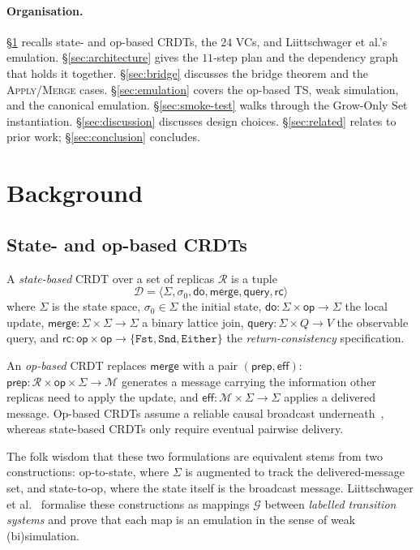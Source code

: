 \documentclass[11pt,a4paper]{article}
\theoremstyle{definition}
\theoremstyle{remark}
\newcommand{\RDT}{\ensuremath{\mathcal{D}}}
\newcommand{\Op}{\mathsf{op}}
\newcommand{\mdo}{\mathsf{do}}
\newcommand{\mmerge}{\mathsf{merge}}
\newcommand{\meff}{\mathsf{eff}}
\newcommand{\mquery}{\mathsf{query}}
\newcommand{\mrc}{\mathsf{rc}}
\newcommand{\mprep}{\mathsf{prep}}
\newcommand{\Either}{\mathtt{Either}}
\newcommand{\Fst}{\mathtt{Fst}}
\newcommand{\Snd}{\mathtt{Snd}}
\newcommand{\State}{\Sigma}
\newcommand{\init}{\sigma_0}
\newcommand{\Replica}{\mathcal{R}}
\newcommand{\Msg}{\mathcal{M}}
\newcommand{\Emul}{\mathcal{G}}
\begin{document}
\paragraph{Organisation.}
\S\ref{sec:background} recalls state- and op-based CRDTs, the $24$
VCs, and Liittschwager et al.'s emulation.
\S\ref{sec:architecture} gives the $11$-step plan and the
dependency graph that holds it together.
\S\ref{sec:bridge} discusses the bridge theorem and the
\textsc{Apply}/\textsc{Merge} cases.
\S\ref{sec:emulation} covers the op-based TS, weak simulation, and
the canonical emulation.
\S\ref{sec:smoke-test} walks through the Grow-Only Set
instantiation.
\S\ref{sec:discussion} discusses design choices.
\S\ref{sec:related} relates to prior work; \S\ref{sec:conclusion}
concludes.

\section{Background}
\label{sec:background}

\subsection{State- and op-based CRDTs}

A \emph{state-based} CRDT over a set of replicas $\Replica$ is a
tuple
\[
  \RDT = \langle \State, \init, \mdo, \mmerge, \mquery, \mrc\rangle
\]
where $\State$ is the state space, $\init \in \State$ the initial
state, $\mdo : \State \times \Op \to \State$ the local update,
$\mmerge : \State \times \State \to \State$ a binary lattice join,
$\mquery : \State \times Q \to V$ the observable query, and
$\mrc : \Op \times \Op \to \{\Fst, \Snd, \Either\}$ the
\emph{return-consistency} specification.

An \emph{op-based} CRDT replaces $\mmerge$ with a pair $(\mprep, \meff)$:
$\mprep : \Replica \times \Op \times \State \to \Msg$ generates a
message carrying the information other replicas need to apply the
update, and $\meff : \Msg \times \State \to \State$ applies a
delivered message. Op-based CRDTs assume a reliable causal broadcast
underneath~\cite{lamport-clocks}, whereas state-based CRDTs only
require eventual pairwise delivery.

The folk wisdom that these two formulations are equivalent stems
from two constructions: op-to-state, where $\State$ is augmented to
track the delivered-message set, and state-to-op, where the state
itself is the broadcast message. Liittschwager et
al.~\cite{liittschwager2025} formalise these constructions as
mappings $\Emul$ between \emph{labelled transition systems} and
prove that each map is an emulation in the sense of weak
(bi)simulation.
\end{document}
